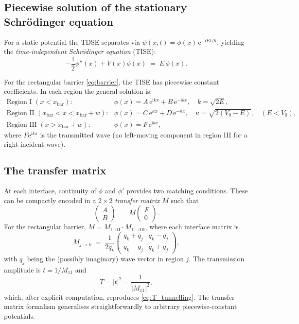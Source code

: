 \documentclass[12pt, a4paper]{article}
\newcommand{\ii}{\mathrm{i}}          %
\newcommand{\ee}{\mathrm{e}}          %
\begin{document}
\subsection{Piecewise solution of the stationary Schr\"{o}dinger equation}

For a static potential the TDSE separates via $\psi(x,t) =
\phi(x)\,\ee^{-\ii Et/\hbar}$, yielding the
\emph{time-independent Schr\"{o}dinger equation} (TISE):
\begin{equation}
  -\frac{1}{2}\phi''(x) + V(x)\phi(x) \;=\; E\,\phi(x).
\end{equation}

For the rectangular barrier \eqref{eq:barrier}, the TISE has piecewise
constant coefficients.  In each region the general solution is:
\begin{align}
  \text{Region I } (x < x_\text{bar}):&\quad
    \phi(x) = A\,\ee^{\ii kx} + B\,\ee^{-\ii kx}, \quad k = \sqrt{2E}, \\
  \text{Region II } (x_\text{bar} < x < x_\text{bar}+w):&\quad
    \phi(x) = C\,\ee^{\kappa x} + D\,\ee^{-\kappa x}, \quad
    \kappa = \sqrt{2(V_0-E)},\quad (E<V_0), \\
  \text{Region III } (x > x_\text{bar}+w):&\quad
    \phi(x) = F\,\ee^{\ii kx},
\end{align}
where $F\ee^{\ii kx}$ is the transmitted wave (no left-moving component
in region III for a right-incident wave).

\subsection{The transfer matrix}

At each interface, continuity of $\phi$ and $\phi'$ provides two
matching conditions.  These can be compactly encoded in a
$2\times 2$ \emph{transfer matrix} $M$ such that
\begin{equation}
  \begin{pmatrix} A \\ B \end{pmatrix}
  \;=\; M \begin{pmatrix} F \\ 0 \end{pmatrix}.
\end{equation}
For the rectangular barrier, $M = M_{\text{I}\to\text{II}}\cdot
M_{\text{II}\to\text{III}}$, where each interface matrix is
\begin{equation}
  M_{j\to k} \;=\; \frac{1}{2q_k}
  \begin{pmatrix}
    q_k + q_j & q_k - q_j \\
    q_k - q_j & q_k + q_j
  \end{pmatrix},
\end{equation}
with $q_j$ being the (possibly imaginary) wave vector in region $j$.
The transmission amplitude is $t = 1/M_{11}$ and
\begin{equation}
  T = |t|^2 = \frac{1}{|M_{11}|^2},
\end{equation}
which, after explicit computation, reproduces \eqref{eq:T_tunnelling}.
The transfer matrix formalism generalises straightforwardly to
arbitrary piecewise-constant potentials.
\end{document}
